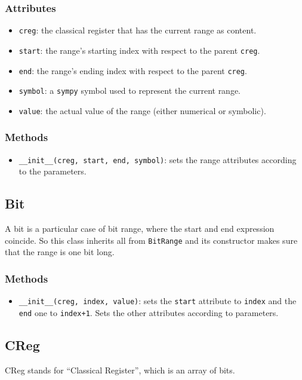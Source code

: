 \documentclass[12pt,a4paper]{report}
\theoremstyle{definition}
\theoremstyle{definition}
\theoremstyle{definition}
\begin{document}
\subsubsection{Attributes}
\begin{itemize}
    \itemsep 0em
    \item \texttt{creg}: the classical register that has the current range as content.
    \item \texttt{start}: the range's starting index with respect to the parent \texttt{creg}.
    \item \texttt{end}: the range's ending index with respect to the parent \texttt{creg}.
    \item \texttt{symbol}: a \texttt{sympy} symbol used to represent the current range.
    \item \texttt{value}: the actual value of the range (either numerical or symbolic).
\end{itemize}
\subsubsection{Methods}
\begin{itemize}
    \itemsep 0em
    \item \texttt{\_\_init\_\_(creg, start, end, symbol)}: sets the range attributes according to the parameters.
\end{itemize}

\subsection{Bit}
A bit is a particular case of bit range, where the start and end expression coincide. So this class inherits all from \texttt{BitRange} and its constructor makes sure that the range is one bit long.
\subsubsection{Methods}
\begin{itemize}
    \itemsep 0em
    \item \texttt{\_\_init\_\_(creg, index, value)}: sets the \texttt{start} attribute to \texttt{index} and the \texttt{end} one to \texttt{index+1}. Sets the other attributes according to parameters.
\end{itemize}




\subsection{CReg}
CReg stands for ``Classical Register'', which is an array of bits.
\end{document}
